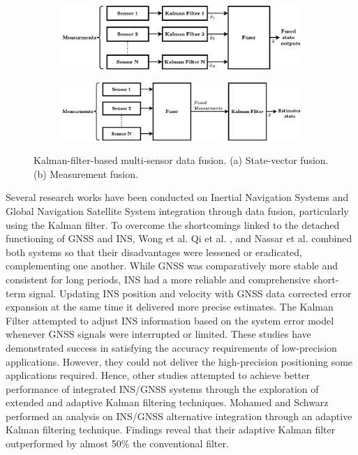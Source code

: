 \begin{figure}
   \centering
   \begin{subfigure}[b]{0.45\textwidth}
      \includegraphics[width=1\linewidth]{figures/kalman1.pdf}
      \caption{}
      \label{fig:statekalman}
   \end{subfigure}
   \begin{subfigure}[b]{0.45\textwidth}
      \includegraphics[width=1\linewidth]{figures/kalman2.pdf}
      \caption{}
      \label{fig:mesearurmentkalman}
   \end{subfigure}

   \caption{ Kalman-filter-based multi-sensor data fusion.
      (a) State-vector fusion. (b) Measurement fusion. \cite{mosallaei2007process} }
\end{figure}

Several research works have been conducted on Inertial Navigation Systems and Global Navigation Satellite System integration through data fusion, particularly using the Kalman filter. To overcome the shortcomings linked to the detached functioning of GNSS and INS, Wong et al. \cite{wong1988high} Qi et al. \cite{qi2002direct}, and Nassar et al. \cite{nassar2004improving} combined both systems so that their disadvantages were lessened or eradicated, complementing one another. While GNSS was comparatively more stable and consistent for long periods, INS had a more reliable and comprehensive short-term signal. Updating INS position and velocity with GNSS data corrected error expansion at the same time it delivered more precise estimates. The Kalman Filter attempted to adjust INS information based on the system error model whenever GNSS signals were interrupted or limited. These studies have demonstrated success in satisfying the accuracy requirements of low-precision applications. However, they could not deliver the high-precision positioning some applications required. Hence, other studies attempted to achieve better performance of integrated INS/GNSS systems through the exploration of extended and adaptive Kalman filtering techniques. Mohamed and Schwarz \cite{mohamed1999adaptive} performed an analysis on INS/GNSS alternative integration through an adaptive Kalman filtering technique. Findings reveal that their adaptive Kalman filter outperformed by almost 50\% the conventional filter.

